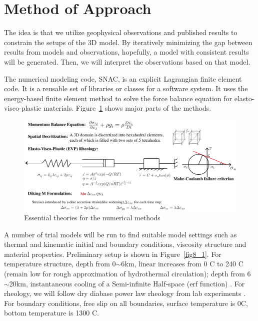\documentclass[12pt]{article}
\begin{document}
\break
\section{Method of Approach}
\label{ch:method}

The idea is that we utilize geophysical observations and published results to constrain the setups of the 3D model. By iteratively minimizing the gap between results from models and observations, hopefully, a model with consistent results will be generated. Then, we will interpret the observations based on that model.

The numerical modeling code, SNAC, is an explicit Lagrangian finite element code. It is a reusable set of libraries or classes for a software system. It uses the energy-based finite element method to solve the force balance equation for elasto-visco-plastic materials. Figure~\ref{fig7_1} shows major parts of the methods.

\begin{figure}[H]
 \centering
  \includegraphics[scale=0.46]{fig7_1.png}
 \caption{\small{Essential theories for the numerical methods}}
 \label{fig7_1}
\end{figure}
 
A number of trial models will be run to find suitable model settings such as thermal and kinematic initial and boundary conditions, viscosity structure and material properties. Preliminary setup is shown in Figure~\ref{fig8_1}. For temperature structure, depth from 0$\sim$6km, linear increases from 0 \degree C to 240 \degree C (remain low for rough approximation of hydrothermal circulation); depth from 6$\sim$20km, instantaneous cooling of a Semi-infinite Half-space (erf function) \citep{Turcotte2002}. For rheology, we will follow dry diabase power law rheology from lab experiments \citep{Kirby1987}. For boundary conditions, free slip on all boundaries, surface temperature is 0\degree C, bottom temperature is 1300 \degree C.
\end{document}
